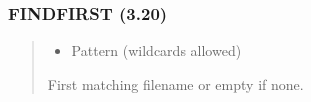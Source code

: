 \documentclass[letterpaper,10pt,english]{sphinxmanual}
\begin{document}
\subsubsection{FINDFIRST (3.20)}
\label{\detokenize{ppl:findfirst-3-20}}\begin{quote}

\sphinxAtStartPar
{}
\begin{description}
\begin{itemize}
\item {} 
\sphinxAtStartPar
{} \textendash{} Pattern (wildcards allowed)

\end{itemize}

\sphinxAtStartPar
First matching filename or empty if none.

\end{description}
\end{quote}
\end{document}
